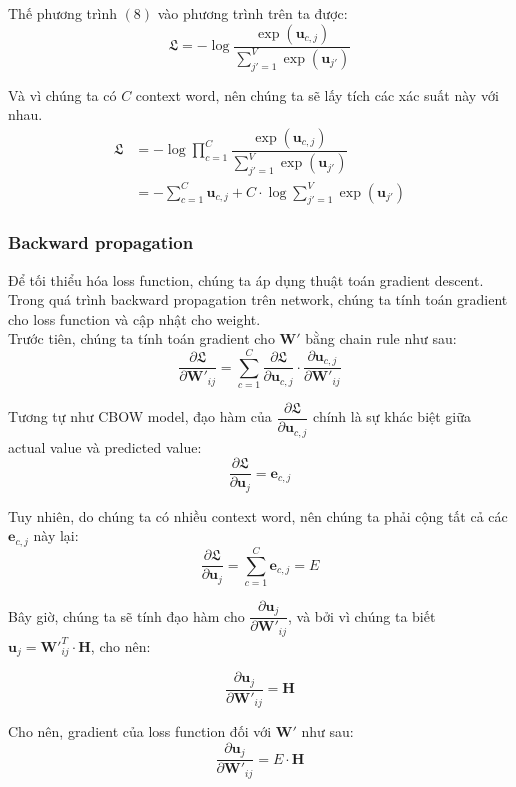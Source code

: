 \documentclass[12pt]{article}
\begin{document}
\indent Thế phương trình $(8)$ vào phương trình trên ta được:
$$\mathfrak{L} = -\log{\dfrac{\exp{(\boldsymbol{u}_{c,j})}}{\sum_{j'=1}^V \exp{(\boldsymbol{u}_{j'})}}}$$

\indent Và vì chúng ta có $C$ context word, nên chúng ta sẽ lấy tích các xác suất này với nhau.
$$\begin{aligned} \mathfrak{L} &= -\log{\prod_{c=1}^{C} \dfrac{\exp{(\boldsymbol{u}_{c,j})}}{\sum_{j'=1}^V \exp{(\boldsymbol{u}_{j'})}}} \\ 
&= -\sum^{C}_{c=1} \boldsymbol{u}_{c,j} + C \cdot \log{\sum^V_{j'=1}} \exp{(\boldsymbol{u}_{j'})} \end{aligned}$$

\subsubsection{Backward propagation}
Để tối thiểu hóa loss function, chúng ta áp dụng thuật toán gradient descent. Trong quá trình backward propagation trên network, chúng ta tính toán gradient cho loss function và cập nhật cho weight.\\

\indent Trước tiên, chúng ta tính toán gradient cho $\boldsymbol{W'}$ bằng chain rule như sau:
$$\dfrac{\partial \mathfrak{L}}{\partial \boldsymbol{W'}_{ij}} = \sum^C_{c=1} \dfrac{\partial \mathfrak{L}}{\partial \boldsymbol{u}_{c,j}} \cdot \dfrac{\partial \boldsymbol{u}_{c,j}}{\partial \boldsymbol{W'}_{ij}}$$

\indent Tương tự như CBOW model, đạo hàm của $\dfrac{\partial \mathfrak{L}}{\partial \boldsymbol{u}_{c,j}}$ chính là sự khác biệt giữa actual value và predicted value:
$$\dfrac{\partial \mathfrak{L}}{\partial \boldsymbol{u}_{j}} = \boldsymbol{e}_{c,j}$$

\indent Tuy nhiên, do chúng ta có nhiều context word, nên chúng ta phải cộng tất cả các $\boldsymbol{e}_{c,j}$ này lại:
$$\dfrac{\partial \mathfrak{L}}{\partial \boldsymbol{u}_{j}} = \sum^C_{c=1} \boldsymbol{e}_{c,j} = E$$

\indent Bây giờ, chúng ta sẽ tính đạo hàm cho $\dfrac{\partial \boldsymbol{u}_j}{\partial \boldsymbol{W'}_{ij}}$, và bởi vì chúng ta biết $\boldsymbol{u}_j = \boldsymbol{W'}_{ij}^T \cdot \boldsymbol{H}$, cho nên:

$$\dfrac{\partial \boldsymbol{u}_j}{\partial \boldsymbol{W'}_{ij}} = \boldsymbol{H}$$

\indent Cho nên, gradient của loss function đối với $\boldsymbol{W'}$ như sau:
$$\dfrac{\partial \boldsymbol{u}_j}{\partial \boldsymbol{W'}_{ij}} = E \cdot \boldsymbol{H}$$
\end{document}
